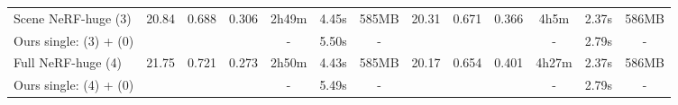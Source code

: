 \begin{table*}[ht!]
{\begin{tabular}{l|*{6}{c}|*{6}{c}}
        \hline
        \hline
        Scene NeRF-huge (3)     & 20.84 & 0.688 & 0.306 & 2h49m & 4.45s & 585MB        
                                                                                & 20.31 & 0.671 & 0.366 & 4h5m & 2.37s & 586MB \\
        Ours single: (3) + (0)                 & \cellcolor{yellow!50}{21.04} & \cellcolor{yellow!50}{0.697} & \cellcolor{yellow!50}{0.293} & -  & 5.50s & -      
                                                                                & \cellcolor{yellow!50}{20.44} & \cellcolor{yellow!50}{0.672} & \cellcolor{yellow!50}{0.365} & -  & 2.79s & - \\
        \hline
        Full NeRF-huge (4)      & 21.75 & 0.721 & 0.273 & 2h50m & 4.43s & 585MB         
                                                                                & 20.17 & 0.654 & 0.401 & 4h27m & 2.37s & 586MB \\
        Ours single: (4) + (0)                 & \cellcolor{yellow!50}{21.93} & \cellcolor{yellow!50}{0.722} & \cellcolor{yellow!50}{0.270} & -  & 5.49s & -      
                                                                                & \cellcolor{yellow!50}{20.34} & \cellcolor{yellow!50}{0.660} & \cellcolor{yellow!50}{0.419} & -  & 2.79s & - \\
        \end{tabular}
    }
\end{table*}